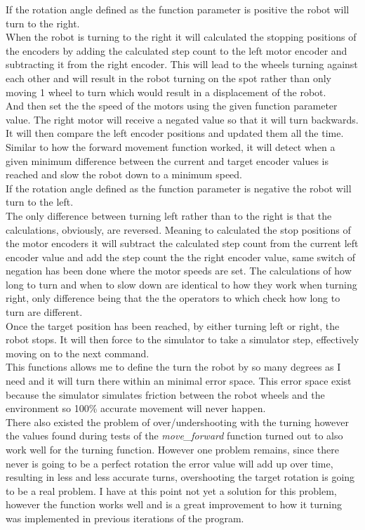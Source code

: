 If the rotation angle defined as the function parameter is positive the robot will turn to the right.\\
When the robot is turning to the right it will calculated the stopping positions of the encoders by adding the calculated step count to the left motor encoder and subtracting it from the right encoder. This will lead to the wheels turning against each other and will result in the robot turning on the spot rather than only moving 1 wheel to turn which would result in a displacement of the robot. \\
And then set the the speed of the motors using the given function parameter value. The right motor will receive a negated value so that it will turn backwards. 
It will then compare the left encoder positions and updated them all the time. Similar to how the forward movement function worked, it will detect when a given minimum difference between the current and target encoder values is reached and slow the robot down to a minimum speed. \\[3ex]

If the rotation angle defined as the function parameter is negative the robot will turn to the left.\\
The only difference between turning left rather than to the right is that the calculations, obviously, are reversed. Meaning to calculated the stop positions of the motor encoders it will subtract the calculated step count from the current left encoder value and add the step count the the right
encoder value, same switch of negation has been done where the motor speeds are set.
The calculations of how long to turn and when to slow down are identical to how they work when turning right, only difference being that the the operators to which check how long to turn are different.\\
Once the target position has been reached, by either turning left or right, the robot stops.
It will then force to the simulator to take a simulator step, effectively moving on to the next command.\\[3ex]

This functions allows me to define the turn the robot by so many degrees as I need and it will turn there within an minimal error space. This error space exist because the simulator simulates friction between the robot wheels and the environment so 100\% accurate movement will never happen.\\
There also existed the problem of over/undershooting with the turning however the values found during tests of the \textit{move\_forward} function turned out to also work well for the turning function. However one problem remains, since there never is going to be a perfect rotation the error value will add up over time, resulting in less and less accurate turns, overshooting the target rotation is going to be a real problem. I have at this point not yet a solution for this problem, however the function works well and is a great improvement to how it turning was implemented in previous iterations of the program.

